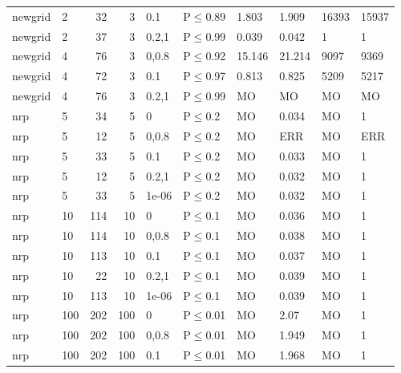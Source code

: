 \begin{longtable}{llrrllllll}
 newgrid       & 2        &     	32 &   3 & 0.1   & P$\leq$0.89  & 1.803    & 1.909   & 16393   & 15937   \\
 newgrid       & 2        &     	37 &   3 & 0.2,1 & P$\leq$0.99  & 0.039    & 0.042   & 1       & 1       \\
 newgrid       & 4        &     	76 &   3 & 0,0.8 & P$\leq$0.92  & 15.146   & 21.214  & 9097    & 9369    \\
 newgrid       & 4        &     	72 &   3 & 0.1   & P$\leq$0.97  & 0.813    & 0.825   & 5209    & 5217    \\
 newgrid       & 4        &     	76 &   3 & 0.2,1 & P$\leq$0.99  & MO       & MO      & MO      & MO      \\
 nrp           & 5        &     	34 &   5 & 0     & P$\leq$0.2   & MO       & 0.034   & MO      & 1       \\
 nrp           & 5        &     	12 &   5 & 0,0.8 & P$\leq$0.2   & MO       & ERR     & MO      & ERR     \\
 nrp           & 5        &     	33 &   5 & 0.1   & P$\leq$0.2   & MO       & 0.033   & MO      & 1       \\
 nrp           & 5        &     	12 &   5 & 0.2,1 & P$\leq$0.2   & MO       & 0.032   & MO      & 1       \\
 nrp           & 5        &     	33 &   5 & 1e-06 & P$\leq$0.2   & MO       & 0.032   & MO      & 1       \\
 nrp           & 10       &    	114 &  10 & 0     & P$\leq$0.1   & MO       & 0.036   & MO      & 1       \\
 nrp           & 10       &    	114 &  10 & 0,0.8 & P$\leq$0.1   & MO       & 0.038   & MO      & 1       \\
 nrp           & 10       &    	113 &  10 & 0.1   & P$\leq$0.1   & MO       & 0.037   & MO      & 1       \\
 nrp           & 10       &     	22 &  10 & 0.2,1 & P$\leq$0.1   & MO       & 0.039   & MO      & 1       \\
 nrp           & 10       &    	113 &  10 & 1e-06 & P$\leq$0.1   & MO       & 0.039   & MO      & 1       \\
 nrp           & 100      &    	202 & 100 & 0     & P$\leq$0.01  & MO       & 2.07    & MO      & 1       \\
 nrp           & 100      &    	202 & 100 & 0,0.8 & P$\leq$0.01  & MO       & 1.949   & MO      & 1       \\
 nrp           & 100      &    	202 & 100 & 0.1   & P$\leq$0.01  & MO       & 1.968   & MO      & 1       \\

\end{longtable}
